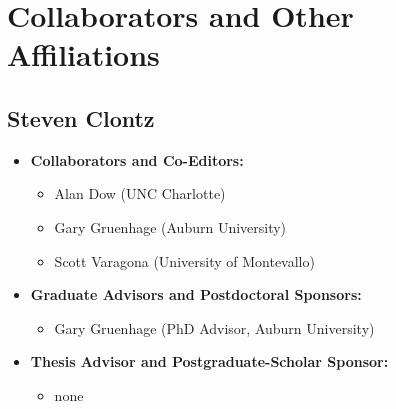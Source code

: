 \documentclass{article}
\begin{document}
\section*{Collaborators and Other Affiliations}

\subsection*{Steven Clontz}

\begin{itemize}

    \item \textbf{Collaborators and Co-Editors:}
        \begin{itemize}
          \item Alan Dow (UNC Charlotte)
          \item Gary Gruenhage (Auburn University)
          \item Scott Varagona (University of Montevallo)
        \end{itemize}

    \item \textbf{Graduate Advisors and Postdoctoral Sponsors:}
        \begin{itemize}
          \item Gary Gruenhage (PhD Advisor, Auburn University)
        \end{itemize}


    \item \textbf{Thesis Advisor and Postgraduate-Scholar Sponsor:}
        \begin{itemize}
          \item none
        \end{itemize}


\end{itemize}
\end{document}
